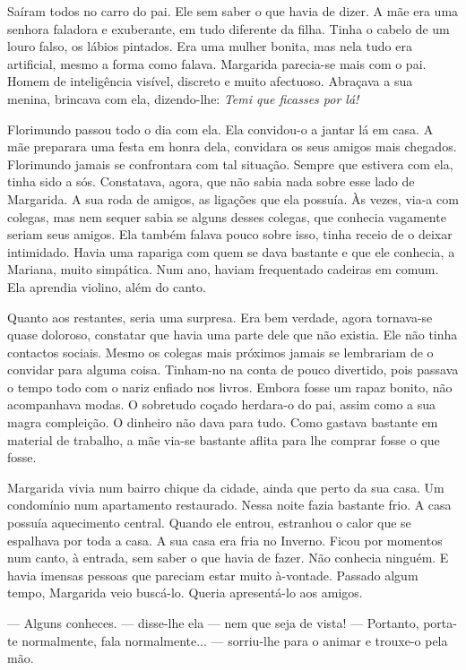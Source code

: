 Saíram todos no carro do pai. Ele sem saber o que havia de dizer. A mãe
era uma senhora faladora e exuberante, em tudo diferente da filha. Tinha
o cabelo de um louro falso, os lábios pintados. Era uma mulher bonita,
mas nela tudo era artificial, mesmo a forma como falava. Margarida
parecia-se mais com o pai. Homem de inteligência visível, discreto e
muito afectuoso. Abraçava a sua menina, brincava com ela, dizendo-lhe:
\emph{Temi que ficasses por lá!}

Florimundo passou todo o dia com ela. Ela convidou-o a jantar lá em
casa. A mãe preparara uma festa em honra dela, convidara os seus amigos
mais chegados. Florimundo jamais se confrontara com tal situação. Sempre
que estivera com ela, tinha sido a sós. Constatava, agora, que não sabia
nada sobre esse lado de Margarida. A sua roda de amigos, as ligações que
ela possuía. Às vezes, via-a com colegas, mas nem sequer sabia se alguns
desses colegas, que conhecia vagamente seriam seus amigos. Ela também
falava pouco sobre isso, tinha receio de o deixar intimidado. Havia uma
rapariga com quem se dava bastante e que ele conhecia, a Mariana, muito
simpática. Num ano, haviam frequentado cadeiras em comum. Ela aprendia
violino, além do canto.

Quanto aos restantes, seria uma surpresa. Era bem verdade, agora
tornava-se quase doloroso, constatar que havia uma parte dele que não
existia. Ele não tinha contactos sociais. Mesmo os colegas mais próximos
jamais se lembrariam de o convidar para alguma coisa. Tinham-no na conta
de pouco divertido, pois passava o tempo todo com o nariz enfiado nos
livros. Embora fosse um rapaz bonito, não acompanhava modas. O sobretudo
coçado herdara-o do pai, assim como a sua magra compleição. O dinheiro
não dava para tudo. Como gastava bastante em material de trabalho, a mãe
via-se bastante aflita para lhe comprar fosse o que fosse.

Margarida vivia num bairro chique da cidade, ainda que perto da sua
casa. Um condomínio num apartamento restaurado. Nessa noite fazia
bastante frio. A casa possuía aquecimento central. Quando ele entrou,
estranhou o calor que se espalhava por toda a casa. A sua casa era fria
no Inverno. Ficou por momentos num canto, à entrada, sem saber o que
havia de fazer. Não conhecia ninguém. E havia imensas pessoas que
pareciam estar muito à-vontade. Passado algum tempo, Margarida veio
buscá-lo. Queria apresentá-lo aos amigos.

--- Alguns conheces. --- disse-lhe ela --- nem que seja de vista! --- Portanto,
porta-te normalmente, fala normalmente... --- sorriu-lhe para o animar e
trouxe-o pela mão.

